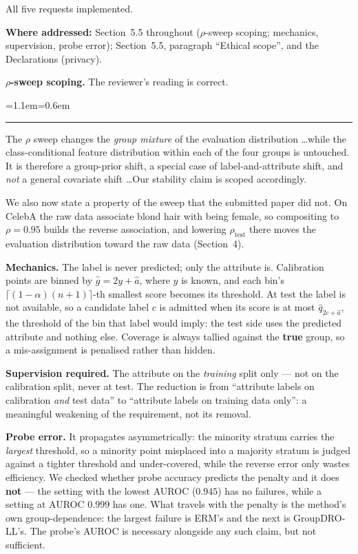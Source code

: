 \documentclass[11pt,a4paper]{article}
\newenvironment{revised}
  {\begin{list}{}{\leftmargin=1.1em\rightmargin=0.6em}\item[]%
   \color{black}\small\hspace{-1.1em}\textcolor{quoterule}{\rule[-0.4ex]{2pt}{1.05em}}\hspace{0.5em}\ignorespaces}
  {\end{list}}
\newcommand{\where}[1]{{\textbf{Where addressed:} #1\par}}
\begin{document}
All five requests implemented.

\where{Section~5.5 throughout ($\rho$-sweep scoping; mechanics, supervision, probe error);
Section~5.5, paragraph ``Ethical scope'', and the Declarations (privacy).}

\textbf{$\rho$-sweep scoping.} The reviewer's reading is correct.

\begin{revised}
The $\rho$ sweep changes the \emph{group mixture} of the evaluation distribution \ldots while the
class-conditional feature distribution within each of the four groups is untouched. It is therefore
a group-prior shift, a special case of label-and-attribute shift, and \emph{not} a general covariate
shift \ldots Our stability claim is scoped accordingly.
\end{revised}

We also now state a property of the sweep that the submitted paper did not. On CelebA the raw data
associate blond hair with being female, so compositing to $\rho=0.95$ builds the reverse
association, and lowering $\rho_{\mathrm{test}}$ there moves the evaluation distribution toward the
raw data (Section~4).

\textbf{Mechanics.} The label is never predicted; only the attribute is. Calibration points are
binned by $\hat g = 2y + \hat a$, where $y$ is known, and each bin's
$\lceil(1-\alpha)(n+1)\rceil$-th smallest score becomes its threshold. At test the label is not
available, so a candidate label $c$ is admitted when its score is at most
$\hat q_{2c + \hat a}$, the threshold of the bin that label would imply: the test side uses the
predicted attribute and nothing else. Coverage is always tallied against the
\textbf{true} group, so a mis-assignment is penalised rather than hidden.

\textbf{Supervision required.} The attribute on the \emph{training} split only --- not on the
calibration split, never at test. The reduction is from ``attribute labels on calibration
\emph{and} test data'' to ``attribute labels on training data only'': a meaningful weakening of the
requirement, not its removal.

\textbf{Probe error.} It propagates asymmetrically: the minority stratum carries the \emph{largest}
threshold, so a minority point misplaced into a majority stratum is judged against a tighter
threshold and under-covered, while the reverse error only wastes efficiency. We checked whether
probe accuracy predicts the penalty and it does \textbf{not} --- the setting with the lowest AUROC
($0.945$) has no failures, while a setting at AUROC $0.999$ has one. What travels with the penalty is
the method's own group-dependence: the largest failure is ERM's and the next is
GroupDRO-LL's. The probe's AUROC is necessary alongside any such claim, but not sufficient.
\end{document}
